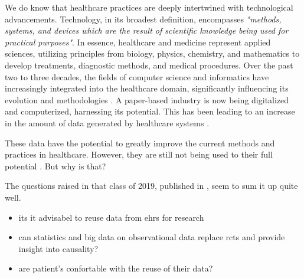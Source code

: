 
We do know that healthcare practices are deeply intertwined with technological advancements. Technology, in its broadest definition, encompasses \textit{"methods, systems, and devices which are the result of scientific knowledge being used for practical purposes"}. In essence, healthcare and medicine represent applied sciences, utilizing principles from biology, physics, chemistry, and mathematics to develop treatments, diagnostic methods, and medical procedures. Over the past two to three decades, the fields of computer science and informatics have increasingly integrated into the healthcare domain, significantly influencing its evolution and methodologies \cite{adler-milsteinHITECHActDrove2017}. A paper-based industry is now being digitalized and computerized, harnessing its potential. This has been leading to an increase in the amount of data generated by healthcare systems \cite{kruseUseElectronicHealth2018,palabindalaAdoptionElectronicHealth2016}.

These data have the potential to greatly improve the current methods and practices in healthcare. However, they are still not being used to their full potential \cite{kruseUseElectronicHealth2018,dicamilloGuestEditorialData2020}. But why is that?

The questions raised in that class of 2019, published in \cite{peekThreeControversiesHealth2018}, seem to sum it up quite well.
\begin{itemize}
    \item its it advisabel to reuse data from \acp{ehr} for research
    \item can statistics and big data on observational data replace \acp{rct} and provide insight into causality?
    \item are patient's confortable with the reuse of their data?
\end{itemize}



